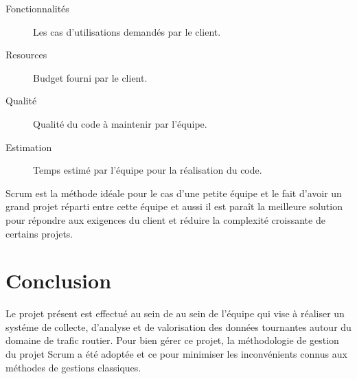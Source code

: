\begin{description}
    \item [Fonctionnalités] Les cas d'utilisations demandés par le client.
    \item [Resources] Budget fourni par le client.
    \item [Qualité] Qualité du code à maintenir par l'équipe.
    \item [Estimation] Temps estimé par l'équipe pour la réalisation du code.
\end{description}



Scrum est la méthode idéale pour le cas d'une petite équipe et le fait d'avoir
un grand projet réparti entre cette équipe et aussi il est paraît la meilleure
solution pour répondre aux exigences du client et réduire la complexité
croissante de certains projets.

\section*{Conclusion}

Le projet présent est effectué au sein de  au sein
de l'équipe  qui vise à réaliser un systéme de collecte,
d'analyse et de valorisation des données tournantes autour du domaine de trafic
routier. Pour bien gérer ce projet, la méthodologie de gestion du projet Scrum
a été adoptée et ce pour minimiser les inconvénients connus aux méthodes de
gestions classiques.

